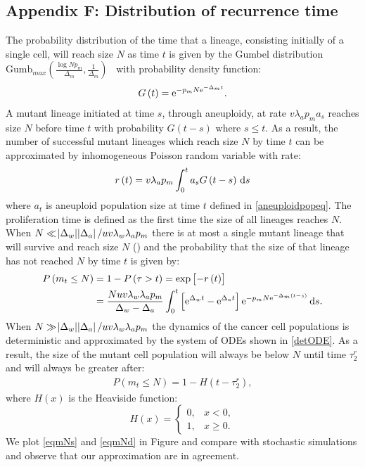\documentclass[12pt]{extarticle}
\renewcommand{\d}[1]{\ensuremath{\operatorname{d}\!{#1}}}
\renewcommand{\d}{{\rm d}}
\newcommand{\e}{{\rm e}}
\begin{document}
\begin{appendices}
\section*{Appendix F: Distribution of recurrence time}
The probability distribution of the time that a lineage, consisting initially of a single cell, will reach size $N$ as time $t$ is given by the Gumbel distribution $\text{Gumb}_{max}\left(\frac{\log Np_m}{\Delta_m},\frac{1}{\Delta_m}\right)$~\citep{avanzini2019cancer} with probability density function:
\begin{align*}
G\left(t\right)=\e^{-p_mN\e^{-\Delta_mt}}.
\end{align*}
A mutant lineage initiated at time $s$, through aneuploidy, at rate $v\lambda_ap_ma_s$ reaches size $N$ before time $t$ with probability $G\left(t-s\right)$ where $s\leq t$. As a result, the number of successful mutant lineages which reach size $N$ by time $t$ can be approximated by inhomogeneous Poisson random variable with rate:
\begin{align*}
r\left(t\right)=v\lambda_ap_m\int_0^t a_sG\left(t-s\right)\,\d s
\end{align*}
where $a_t$ is aneuploid population size at time $t$ defined in \cref{aneuploidpopeq}. The proliferation time is defined as the first time the size of all lineages reaches $N$. When $N\ll\abs{\Delta_w}\abs{\Delta_a}/uv\lambda_w\lambda_ap_m$ there is at most a single mutant lineage that will survive and reach size $N$ () and the probability that the size of that lineage has not reached $N$ by time $t$ is given by:
\begin{align}\nonumber
P\left(m_t\leq N\right)&=1-P\left(\tau>t\right)=\exp\left[-r\left(t\right)\right]\\ \label{eqmNs}
&=\frac{Nuv\lambda_w\lambda_ap_m}{\Delta_w-\Delta_a}\int_0^t\left[\e^{\Delta_wt}-\e^{\Delta_at}\right]\e^{-p_mN\e^{-\Delta_m\left(t-s\right)}}\,\d s.
\end{align}
When $N\gg\abs{\Delta_w}\abs{\Delta_a}/uv\lambda_w\lambda_ap_m$ the dynamics of the cancer cell populations is deterministic and approximated by the system of ODEs shown in \cref{detODE}. As a result, the size of the mutant cell population will always be below $N$ until time $\tau_2^r$ and will always be greater after:
\begin{align}\label{eqmNd}
P\left(m_t\leq N\right)=1-H\left(t-\tau_2^r\right),
\end{align}
where $H(x)$ is the Heaviside function:
\begin{equation*}
H\left(x\right) = \begin{cases}
    0 ,&
  x<0 ,\\ 
  1 ,&
  x\geq0 .
  \end{cases}
\end{equation*}
We plot \cref{eqmNs} and \cref{eqmNd} in Figure and compare with stochastic simulations and observe that our approximation are in agreement. 


\end{appendices}
\end{document}
